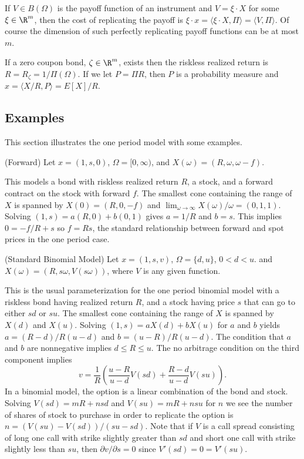 If $V\in B(\Omega)$ is the payoff function of an instrument and $V =
\xi\cdot X$ for some $\xi\in\R^m$, then the cost of replicating the payoff
is $\xi\cdot x = \langle \xi\cdot X,\Pi\rangle = \langle V,\Pi\rangle$.
Of course the dimension of such perfectly replicating payoff functions
can be at most $m$.

If a zero coupon bond, $\zeta\in\R^m$, exists then the riskless realized
return is $R = R_\zeta = 1/\Pi(\Omega)$. If we let $P = \Pi R$, then $P$
is a probability measure and $x = \langle X/R,P\rangle = E[X]/R$.


\subsection{Examples}
This section illustrates the one period model with some examples.

\begin{example}{(Forward)}
Let $x = (1, s, 0)$, $\Omega = [0,\infty)$,
and $X(\omega) = (R, \omega, \omega - f)$.
\end{example}
This models a bond with riskless realized
return $R$, a stock, and a forward contract on the stock with forward $f$.
The smallest cone containing the range of $X$ is spanned
by $X(0) = (R, 0, -f)$ and $\lim_{\omega\to\infty}X(\omega)/\omega = (0, 1, 1)$.
Solving $(1, s) = a(R, 0) + b(0, 1)$ gives $a = 1/R$ and $b = s$.
This implies $0 = -f/R + s$ so $f = Rs$, the standard
relationship between forward and spot prices in the one period case. 
\cite{Hul2005}

\begin{example}{(Standard Binomial Model)}
Let $x = (1, s, v)$, $\Omega = \{d, u\}$, $0<d<u$.
and $X(\omega) = (R, s\omega, V(s\omega))$, where $V$ is any given function.
\end{example}
This is the usual parameterization for the one period binomial model with
a riskless bond having realized return $R$, and a stock having price $s$
that can go to either $sd$ or $su$.  The smallest cone containing the
range of $X$ is spanned by $X(d)$ and $X(u)$.  Solving $(1, s) = aX(d)
+ bX(u)$ for $a$ and $b$ yields $a = (R - d)/R(u - d)$ and $b = (u -
R)/R(u - d)$. The condition that $a$ and $b$ are nonnegative implies $d
\le R \le u$. The no arbitrage condition on the third component implies
\begin{equation*}
  v = \frac{1}{R}\left(\frac{u - R}{u - d} V(sd)
    + \frac{R - d}{u - d} V(su)\right).
\end{equation*}
In a binomial model, the option is a linear combination of the bond
and stock.
Solving $V(sd) = mR + nsd$ and $V(su) = mR + nsu$ for $n$ we see
the number of shares of stock to purchase in order to replicate the option
is
$n = (V(su) - V(sd))/(su - sd)$. 
Note that if $V$ is a call spread consisting of long one call with strike
slightly greater than $sd$ and short one call with strike slightly less
than $su$, then $\partial v/\partial s = 0$ since $V'(sd) = 0 = V'(su)$.

